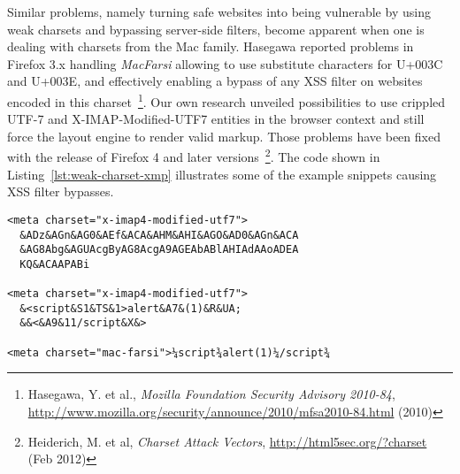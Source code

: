      Similar problems, namely turning safe websites into being vulnerable by using weak charsets and bypassing server-side filters, become apparent when one is dealing with charsets from the Mac family. Hasegawa reported problems in Firefox 3.x handling \textit{MacFarsi} allowing to use substitute characters for U+003C and U+003E, and effectively enabling a bypass of any XSS filter on websites encoded in this charset~\footnote{Hasegawa, Y. et al., \textit{Mozilla Foundation Security Advisory 2010-84}, \url{http://www.mozilla.org/security/announce/2010/mfsa2010-84.html} (2010)}. 
     Our own research unveiled possibilities to use crippled UTF-7 and X-IMAP-Modified-UTF7 entities in the browser context and still force the layout engine to render valid markup. Those problems have been fixed with the release of Firefox 4 and later versions~\footnote{Heiderich, M. et al, \textit{Charset Attack Vectors}, \url{http://html5sec.org/?charset} (Feb 2012)}. The code shown in Listing~\ref{lst:weak-charset-xmp} illustrates some of the example snippets causing XSS filter bypasses.

\begin{lstlisting}[captionpos=b,label=lst:weak-charset-xmp,caption=Executing JavaScript utilizing vulnerable and improperly implemented charsets,captionpos=b]
<meta charset="x-imap4-modified-utf7">
  &ADz&AGn&AG0&AEf&ACA&AHM&AHI&AGO&AD0&AGn&ACA
  &AG8Abg&AGUAcgByAG8AcgA9AGEAbABlAHIAdAAoADEA
  KQ&ACAAPABi

<meta charset="x-imap4-modified-utf7">
  &<script&S1&TS&1>alert&A7&(1)&R&UA;
  &&<&A9&11/script&X&>

<meta charset="mac-farsi">¼script¾alert(1)¼/script¾
\end{lstlisting}

